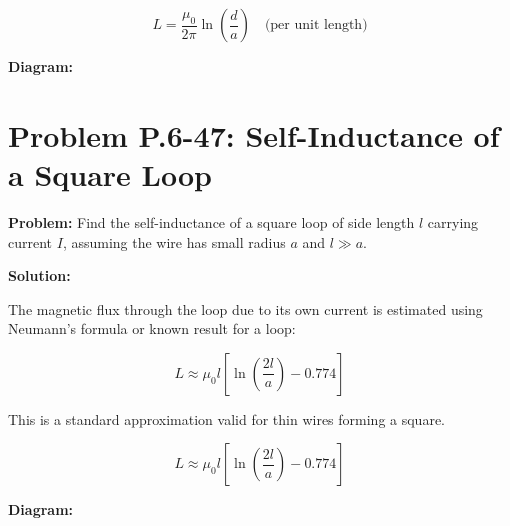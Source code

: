 \documentclass[12pt]{article}
\begin{document}
\begin{tcolorbox}
\[
\boxed{L = \frac{\mu_0}{2\pi} \ln\left( \frac{d}{a} \right)} \quad \text{(per unit length)}
\]
\end{tcolorbox}

\textbf{Diagram:}
\begin{center}
\end{center}



\section*{Problem P.6-47: Self-Inductance of a Square Loop}

\textbf{Problem:}  
Find the self-inductance of a square loop of side length \( l \) carrying current \( I \), assuming the wire has small radius \( a \) and \( l \gg a \).

\textbf{Solution:}

The magnetic flux through the loop due to its own current is estimated using Neumann’s formula or known result for a loop:

\[
L \approx \mu_0 l \left[ \ln\left( \frac{2l}{a} \right) - 0.774 \right]
\]

This is a standard approximation valid for thin wires forming a square.

\begin{tcolorbox}
\[
\boxed{L \approx \mu_0 l \left[ \ln\left( \frac{2l}{a} \right) - 0.774 \right]}
\]
\end{tcolorbox}

\textbf{Diagram:}
\begin{center}
\end{center}
\end{document}
